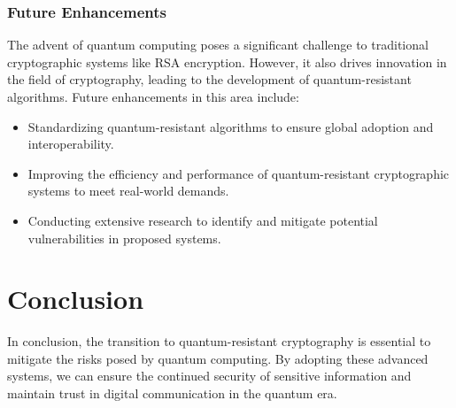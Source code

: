 \documentclass[12pt,a4paper]{report}
\begin{document}
\subsection{Future Enhancements}
The advent of quantum computing poses a significant challenge to traditional cryptographic systems like RSA encryption. However, it also drives innovation in the field of cryptography, leading to the development of quantum-resistant algorithms. Future enhancements in this area include:
\begin{itemize}
    \item Standardizing quantum-resistant algorithms to ensure global adoption and interoperability.
    \item Improving the efficiency and performance of quantum-resistant cryptographic systems to meet real-world demands.
    \item Conducting extensive research to identify and mitigate potential vulnerabilities in proposed systems.
\end{itemize}


\chapter{Conclusion}
In conclusion, the transition to quantum-resistant cryptography is essential to mitigate the risks posed by quantum computing. By adopting these advanced systems, we can ensure the continued security of sensitive information and maintain trust in digital communication in the quantum era.
\end{document}
